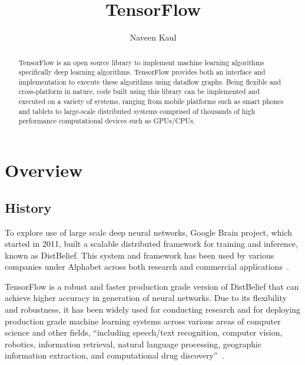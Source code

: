 
\title{TensorFlow}


\author{Naveen Kaul}


\renewcommand{\shortauthors}{N. Kaul}


\begin{abstract}
TensorFlow is an open source library to implement machine
learning algorithms specifically deep learning algorithms. TensorFlow
provides both an interface and implementation to execute these
algorithms using dataflow graphs. Being flexible and cross-platform in
nature, code built using this library can be implemented and executed
on a variety of systems, ranging from mobile platforms such as smart
phones and tablets to large-scale distributed systems comprised of
thousands of high performance computational devices such as
GPUs/CPUs. 

\end{abstract}


\maketitle

\section{Overview}

\subsection{History}
To explore use of large scale deep neural networks, Google Brain
project, which started in 2011, built a scalable distributed framework
for training and inference, known as DistBelief. This system and
framework has been used by various companies under Alphabet across
both research and commercial
applications~\cite{hid-sp18-510-tensorflow2015-whitepaper}. 

TensorFlow is a robust and faster production grade version of
DistBelief that can achieve higher accuracy in generation of neural
networks. Due to its flexibility and robustness, it has been widely
used for conducting research and for deploying production grade
machine learning systems across various areas of computer science and
other fields, ``including speech/text recognition, computer vision,
robotics, information retrieval, natural language processing,
geographic information extraction, and computational drug
discovery''~\cite{hid-sp18-510-tensorflow2015-whitepaper}. 


